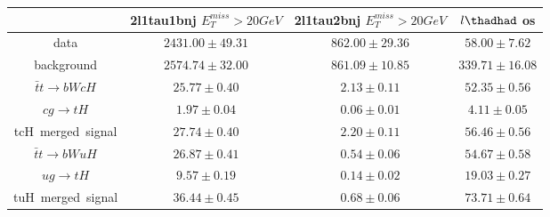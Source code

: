 \begin{tabular}{|c|c|c|c|} \hline
 & 2l1tau1bnj  $E_T^{miss}>20GeV$ & 2l1tau2bnj  $E_T^{miss}>20GeV$ & $l\thadhad$ os\\\hline
data & $2431.00\pm49.31$ & $862.00\pm29.36$ & $58.00\pm7.62$\\\hline
background & $2574.74\pm32.00$ & $861.09\pm10.85$ & $339.71\pm16.08$\\\hline
$\bar{t}t\to bWcH$ & $25.77\pm0.40$ & $2.13\pm0.11$ & $52.35\pm0.56$\\\hline
$cg\to tH$ & $1.97\pm0.04$ & $0.06\pm0.01$ & $4.11\pm0.05$\\\hline
tcH~merged~signal & $27.74\pm0.40$ & $2.20\pm0.11$ & $56.46\pm0.56$\\\hline
$\bar{t}t\to bWuH$ & $26.87\pm0.41$ & $0.54\pm0.06$ & $54.67\pm0.58$\\\hline
$ug\to tH$ & $9.57\pm0.19$ & $0.14\pm0.02$ & $19.03\pm0.27$\\\hline
tuH~merged~signal & $36.44\pm0.45$ & $0.68\pm0.06$ & $73.71\pm0.64$\\\hline
\end{tabular}
